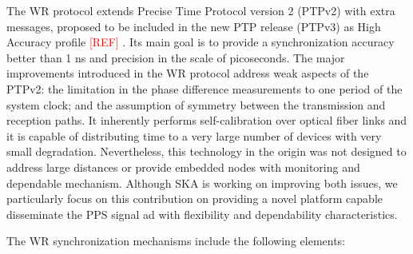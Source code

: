 The WR protocol extends Precise Time Protocol version 2 (PTPv2) with extra messages, proposed to be included in the new PTP release (PTPv3) as High Accuracy profile \textcolor{red}{[REF]}
. Its main goal is to provide a synchronization accuracy better than 1 ns and precision in the scale of picoseconds. The major improvements introduced in the WR protocol address weak aspects of the PTPv2: the limitation in the phase difference measurements to one period of the system clock; and the assumption of symmetry between the transmission and reception paths. It inherently performs self-calibration over optical fiber links and it is capable of distributing time to a very large number of devices with very small degradation. Nevertheless, this technology in the origin was not designed to address large distances or provide embedded nodes with monitoring and dependable mechanism. Although SKA is working on improving both issues, we particularly focus on this contribution on providing a novel platform capable disseminate the PPS signal ad with flexibility and dependability characteristics.  



The WR synchronization mechanisms include the following elements:

